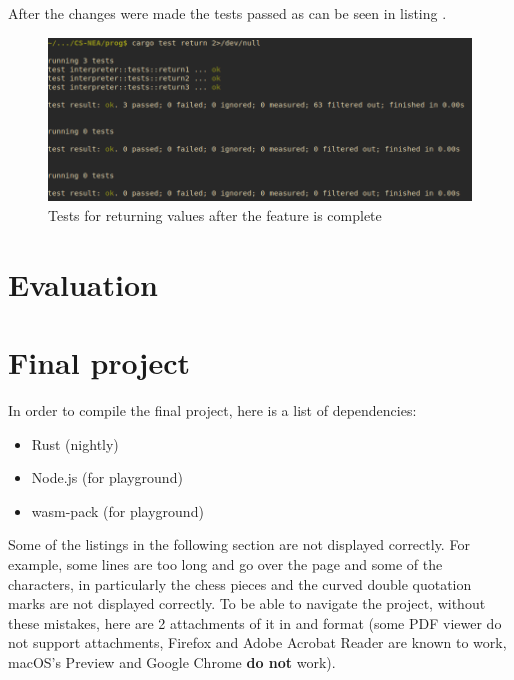 \documentclass{article}
\begin{document}
After the changes were made the tests passed as can be seen in listing
.

\begin{figure}
	\includegraphics[width=\textwidth]{return_after}
	\caption{Tests for returning values after the feature is complete}
	\label{fig:return_after}
\end{figure}



\section{Evaluation}


\section{Final project}
\label{sec:final_project}

In order to compile the final project, here is a list of dependencies:

\begin{itemize}
	\item Rust (nightly)
	\item Node.js (for playground)
	\item wasm-pack (for playground)
\end{itemize}

Some of the listings in the following section are not displayed correctly. For
example, some lines are too long and go over the page and some of the
characters, in particularly the chess pieces and the curved double quotation
marks are not displayed correctly. To be able to navigate the project, without
these mistakes, here are 2 attachments of it in
 and
 format (some PDF viewer do not
support attachments, Firefox and Adobe Acrobat Reader are known to work,
macOS's Preview and Google Chrome \textbf{do not} work).
\end{document}
